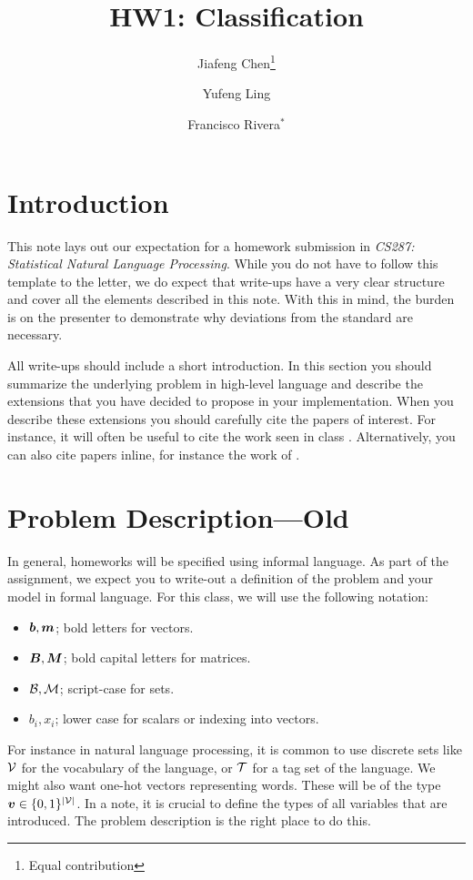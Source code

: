 \documentclass[11pt]{article}
\title{HW1: Classification}
\author{Jiafeng Chen\footnote{Equal contribution} \and Yufeng Ling \and
Francisco Rivera$^{*}$}
\begin{document}
\maketitle{}
\section{Introduction}

This note lays out our expectation for a homework submission in
\textit{CS287: Statistical Natural Language Processing}. While you do
not have to follow this template to the letter, we do expect that
write-ups have a very clear structure and cover all the elements
described in this note. With this in mind, the burden is on the
presenter to demonstrate why deviations from the standard are
necessary.

All write-ups should include a short introduction. In this section you
should summarize the underlying problem in high-level language and
describe the extensions that you have decided to propose in your
implementation. When you describe these extensions you should
carefully cite the papers of interest. For instance, it will often be
useful to cite the work seen in class
\citep{murphy2012machine}. Alternatively, you can also cite papers
inline, for instance the work of \citet{berger1996maximum}.


\section{Problem Description---Old}

In general, homeworks will be specified using informal
language. As part of the assignment, we expect you to write-out a
definition of the problem and your model in formal language. For this
class, we will use the following notation:

\begin{itemize}
\item $\boldsymbol{b}, \boldsymbol{m}$;  bold letters for vectors.
\item $\boldsymbol{B}, \boldsymbol{M}$;  bold capital letters for matrices.
\item $\mathcal{B}, \mathcal{M}$;  script-case for sets.
\item $b_i, x_i$; lower case for scalars or indexing into vectors.
\end{itemize}


For instance in natural language processing, it is common to use
discrete sets like $\mathcal{V}$ for the vocabulary of the language, or $\mathcal{T}$ for a
tag set of the language.  We might also want one-hot vectors
representing words. These will be of the type
$\boldsymbol{v} \in \{0,1\}^{|\mathcal{V}|}$. In a note, it is crucial to define the
types of all variables that are introduced. The problem description is the
right place to do this.
\end{document}
